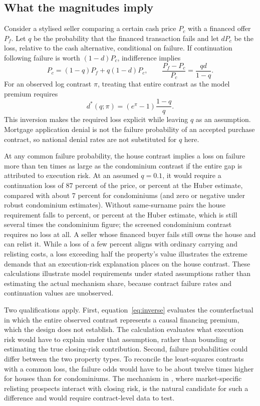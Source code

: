 \documentclass[12pt]{article}
\begin{document}
\subsection{What the magnitudes imply}
Consider a stylised seller comparing a certain cash price $P_c$ with a financed offer $P_f$. Let $q$ be the probability that the financed transaction fails and let $dP_c$ be the loss, relative to the cash alternative, conditional on failure. If continuation following failure is worth $(1-d)P_c$, indifference implies
\begin{equation}
P_c=(1-q)P_f+q(1-d)P_c,
\qquad \frac{P_f-P_c}{P_c}=\frac{qd}{1-q}.
\end{equation}
For an observed log contrast $\pi$, treating that entire contrast as the model premium requires
\begin{equation}\label{eq:inverse}
d^*(q;\pi)=(e^\pi-1)\frac{1-q}{q}.
\end{equation}
This inversion makes the required loss explicit while leaving $q$ as an assumption. Mortgage application denial is not the failure probability of an accepted purchase contract, so national denial rates are not substituted for $q$ here.


At any common failure probability, the house contrast implies a loss on failure more than ten times as large as the condominium contrast if the entire gap is attributed to execution risk. At an assumed $q=0.1$, it would require a continuation loss of 87 percent of the price, or \RobustHouseInvQTen{} percent at the Huber estimate, compared with about 7 percent for condominiums (and zero or negative under robust condominium estimates). Without same-surname pairs the house requirement falls to \NoRelInvQTen{} percent, or \NoRelHuberInvQTen{} percent at the Huber estimate, which is still several times the condominium figure; the screened condominium contrast requires no loss at all. A seller whose financed buyer fails still owns the house and can relist it. While a loss of a few percent aligns with ordinary carrying and relisting costs, a loss exceeding half the property's value illustrates the extreme demands that an execution-risk explanation places on the house contrast. These calculations illustrate model requirements under stated assumptions rather than estimating the actual mechanism share, because contract failure rates and continuation values are unobserved.

Two qualifications apply. First, equation~\eqref{eq:inverse} evaluates the counterfactual in which the entire observed contrast represents a causal financing premium, which the design does not establish. The calculation evaluates what execution risk would have to explain under that assumption, rather than bounding or estimating the true closing-risk contribution. Second, failure probabilities could differ between the two property types. To reconcile the least-squares contrasts with a common loss, the failure odds would have to be about twelve times higher for houses than for condominiums. The mechanism in \citet{hanhong2024}, where market-specific relisting prospects interact with closing risk, is the natural candidate for such a difference and would require contract-level data to test.
\end{document}

